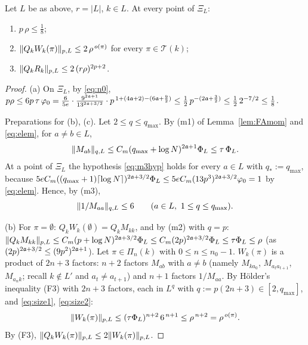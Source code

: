 \begin{lemma}\label{lem:FAsize}
Let $L$ be as above, $r=|L|$, $k\in L$. At every point of $\Xi_L$:
\begin{enumerate}[label=\textup{(\alph*)},leftmargin=2.2em,itemsep=1pt]
\item $p\,\rho\le\frac18$;
\item $\|Q_kW_k(\pi)\|_{p,L}\le2\,\rho^{\,o(\pi)}$ for every $\pi\in\mathcal T(k)$;
\item $\|Q_kR_k\|_{p,L}\le2\,(r\rho)^{2p+2}$.
\end{enumerate}
\end{lemma}
\begin{proof}
(a) On $\Xi_L$, by \eqref{eq:n0},
$p\rho\le6p\,\tau\,\varphi_0=\frac{6}{5e}\cdot\frac{9^{2\mathfrak{a}+1}}{13^{2\mathfrak{a}+3/2}}\cdot p^{\,1+(4\mathfrak{a}+2)-(6\mathfrak{a}+\frac92)}\le\frac12\,p^{-(2\mathfrak{a}+\frac32)}\le\frac12\,2^{-7/2}\le\frac18$.

Preparations for (b), (c). Let $2\le q\le q_{\max}$. By (m1) of Lemma~\ref{lem:FAmom} and \eqref{eq:elem}, for $a\ne b\in L$,
\begin{equation}\label{eq:size1}
 \|M_{ab}\|_{q,L}\le C_m(q_{\max}+\log N)^{2\mathfrak{a}+1}\Phi_L\le\tau\,\Phi_L .
\end{equation}
At a point of $\Xi_L$ the hypothesis \eqref{eq:m3hyp} holds for every $a\in L$ with $q_*:=q_{\max}$, because $5eC_m((q_{\max}+1)\lceil\log N\rceil)^{2\mathfrak{a}+3/2}\Phi_L\le5eC_m(13p^3)^{2\mathfrak{a}+3/2}\varphi_0=1$ by \eqref{eq:elem}. Hence, by (m3),
\begin{equation}\label{eq:size2}
 \|1/M_{aa}\|_{q,L}\le6\qquad(a\in L,\ 1\le q\le q_{\max}).
\end{equation}

(b) For $\pi=\emptyset$: $Q_kW_k(\emptyset)=Q_kM_{kk}$, and by (m2) with $q=p$: $\|Q_kM_{kk}\|_{p,L}\le C_m(p+\log N)^{2\mathfrak{a}+3/2}\Phi_L\le C_m(2p)^{2\mathfrak{a}+3/2}\Phi_L\le\tau\Phi_L\le\rho$ (as $(2p)^{2\mathfrak{a}+3/2}\le(9p^2)^{2\mathfrak{a}+1}$).
Let $\pi\in\Pi_n(k)$ with $0\le n\le n_0-1$. $W_k(\pi)$ is a product of $2n+3$ factors: $n+2$ factors $M_{ab}$ with $a\ne b$ (namely $M_{ka_0}$, $M_{a_ta_{t+1}}$, $M_{a_nk}$; recall $k\notin L'$ and $a_t\ne a_{t+1}$) and $n+1$ factors $1/M_{aa}$.
By H\"older's inequality (F3) with $2n+3$ factors, each in $L^{q}$ with $q:=p(2n+3)\in[2,q_{\max}]$, and \eqref{eq:size1}, \eqref{eq:size2}:
\[
 \|W_k(\pi)\|_{p,L}\le(\tau\Phi_L)^{n+2}\,6^{\,n+1}\le\rho^{\,n+2}=\rho^{\,o(\pi)} .
\]
By (F3), $\|Q_kW_k(\pi)\|_{p,L}\le2\|W_k(\pi)\|_{p,L}$.


\end{proof}
